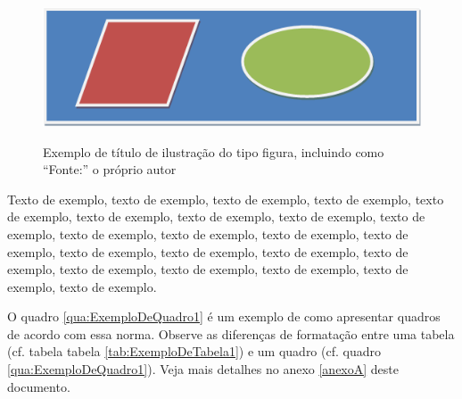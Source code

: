 \documentclass[
	12pt,				%
	oneside,			%
	a4paper,			%
	english,			%
	brazil				%
	]{abntex2ppgsi}
\begin{document}
% 
%
%
%
%
\begin{figure}[H]%
	\centering
 	  \caption{Exemplo de título de ilustração do tipo figura, incluindo como ``Fonte:'' o próprio autor}
		\includegraphics{figura-exemplo.png}
	\label{fig:figura-exemplo1}
\end{figure}

Texto de exemplo, texto de exemplo, texto de exemplo, texto de exemplo, texto de exemplo, texto de exemplo, texto de exemplo, texto de exemplo, texto de exemplo, texto de exemplo, texto de exemplo, texto de exemplo, texto de exemplo, texto de exemplo, texto de exemplo, texto de exemplo, texto de exemplo, texto de exemplo, texto de exemplo, texto de exemplo, texto de exemplo, texto de exemplo.

O quadro \ref{qua:ExemploDeQuadro1} é um exemplo de como apresentar quadros de acordo com essa norma. Observe as diferenças de formatação entre uma tabela (cf. tabela tabela \ref{tab:ExemploDeTabela1}) e um quadro (cf. quadro \ref{qua:ExemploDeQuadro1}). Veja mais detalhes no anexo \ref{anexoA} deste documento.
\end{document}
